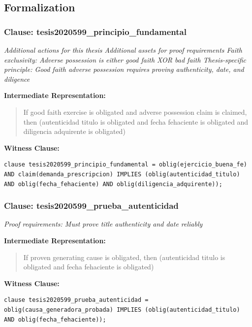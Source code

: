 \documentclass[11pt,a4paper]{article}
\begin{document}
\subsection{Formalization}

\subsubsection{Clause: tesis2020599\_principio\_fundamental}

\textit{Additional actions for this thesis Additional assets for proof requirements Faith exclusivity: Adverse possession is either good faith XOR bad faith Thesis-specific principle: Good faith adverse possession requires proving authenticity, date, and diligence}

\textbf{Intermediate Representation:}

\begin{quote}
If good faith exercise is obligated and adverse possession claim is claimed, then (autenticidad titulo is obligated and fecha fehaciente is obligated and diligencia adquirente is obligated)
\end{quote}

\textbf{Witness Clause:}

\begin{lstlisting}[style=witnessstyle, language=Witness]
clause tesis2020599_principio_fundamental = oblig(ejercicio_buena_fe) AND claim(demanda_prescripcion) IMPLIES (oblig(autenticidad_titulo) AND oblig(fecha_fehaciente) AND oblig(diligencia_adquirente));
\end{lstlisting}

\subsubsection{Clause: tesis2020599\_prueba\_autenticidad}

\textit{Proof requirements: Must prove title authenticity and date reliably}

\textbf{Intermediate Representation:}

\begin{quote}
If proven generating cause is obligated, then (autenticidad titulo is obligated and fecha fehaciente is obligated)
\end{quote}

\textbf{Witness Clause:}

\begin{lstlisting}[style=witnessstyle, language=Witness]
clause tesis2020599_prueba_autenticidad = oblig(causa_generadora_probada) IMPLIES (oblig(autenticidad_titulo) AND oblig(fecha_fehaciente));
\end{lstlisting}
\end{document}
